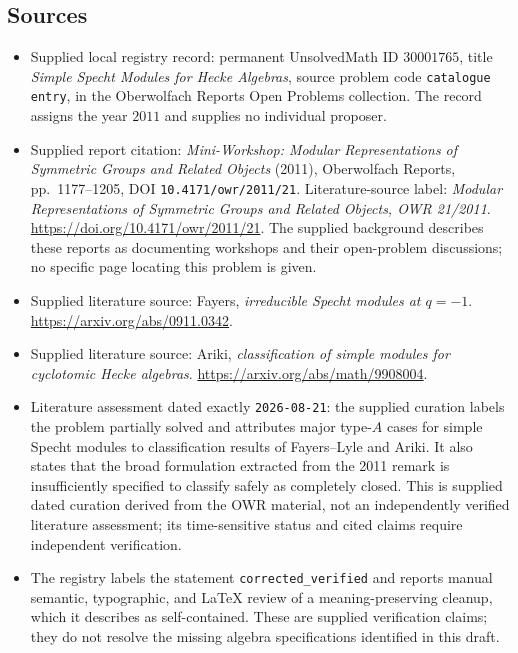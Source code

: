 \documentclass[11pt]{article}
\begin{document}
\subsection{Sources}
\begin{itemize}
\item Supplied local registry record: permanent UnsolvedMath ID \(30001765\), title \emph{Simple Specht Modules for Hecke Algebras}, source problem code \texttt{catalogue entry}, in the Oberwolfach Reports Open Problems collection. The record assigns the year \(2011\) and supplies no individual proposer.
\item Supplied report citation: \emph{Mini-Workshop: Modular Representations of Symmetric Groups and Related Objects} (2011), Oberwolfach Reports, pp.~1177--1205, DOI \texttt{10.4171/owr/2011/21}. Literature-source label: \emph{Modular Representations of Symmetric Groups and Related Objects, OWR 21/2011}. \url{https://doi.org/10.4171/owr/2011/21}. The supplied background describes these reports as documenting workshops and their open-problem discussions; no specific page locating this problem is given.
\item Supplied literature source: Fayers, \emph{irreducible Specht modules at \(q=-1\)}. \url{https://arxiv.org/abs/0911.0342}.
\item Supplied literature source: Ariki, \emph{classification of simple modules for cyclotomic Hecke algebras}. \url{https://arxiv.org/abs/math/9908004}.
\item Literature assessment dated exactly \texttt{2026-08-21}: the supplied curation labels the problem partially solved and attributes major type-\(A\) cases for simple Specht modules to classification results of Fayers--Lyle and Ariki. It also states that the broad formulation extracted from the 2011 remark is insufficiently specified to classify safely as completely closed. This is supplied dated curation derived from the OWR material, not an independently verified literature assessment; its time-sensitive status and cited claims require independent verification.
\item The registry labels the statement \texttt{corrected\_verified} and reports manual semantic, typographic, and LaTeX review of a meaning-preserving cleanup, which it describes as self-contained. These are supplied verification claims; they do not resolve the missing algebra specifications identified in this draft.
\end{itemize}
\end{document}

